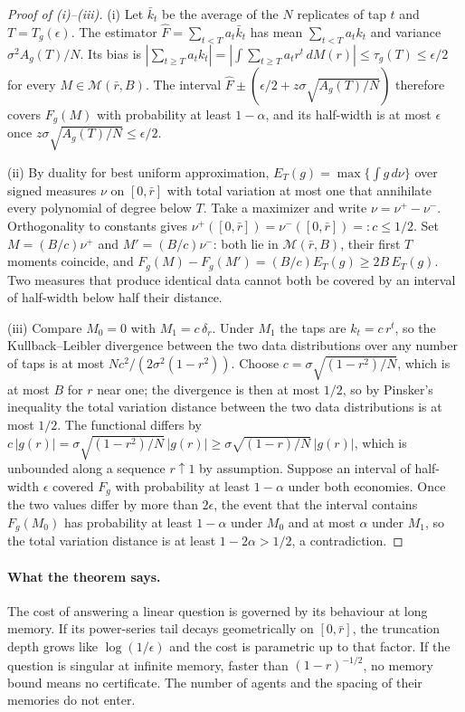 \begin{proof}[Proof of (i)--(iii)]
(i) Let $\bar k_t$ be the average of the $N$ replicates of tap $t$ and $T=T_g(\epsilon)$. The estimator $\hat F=\sum_{t<T}a_t\bar k_t$ has mean $\sum_{t<T}a_tk_t$ and variance $\sigma^2A_g(T)/N$. Its bias is $|\sum_{t\ge T}a_tk_t|=|\int\sum_{t\ge T}a_tr^t\,dM(r)|\le\tau_g(T)\le\epsilon/2$ for every $M\in\mathcal M(\bar r,B)$. The interval $\hat F\pm(\epsilon/2+z\sigma\sqrt{A_g(T)/N})$ therefore covers $F_g(M)$ with probability at least $1-\alpha$, and its half-width is at most $\epsilon$ once $z\sigma\sqrt{A_g(T)/N}\le\epsilon/2$.

(ii) By duality for best uniform approximation, $E_T(g)=\max\{\int g\,d\nu\}$ over signed measures $\nu$ on $[0,\bar r]$ with total variation at most one that annihilate every polynomial of degree below $T$. Take a maximizer and write $\nu=\nu^+-\nu^-$. Orthogonality to constants gives $\nu^+([0,\bar r])=\nu^-([0,\bar r])=:c\le1/2$. Set $M=(B/c)\nu^+$ and $M'=(B/c)\nu^-$: both lie in $\mathcal M(\bar r,B)$, their first $T$ moments coincide, and $F_g(M)-F_g(M')=(B/c)E_T(g)\ge2B\,E_T(g)$. Two measures that produce identical data cannot both be covered by an interval of half-width below half their distance.

(iii) Compare $M_0=0$ with $M_1=c\,\delta_r$. Under $M_1$ the taps are $k_t=c\,r^t$, so the Kullback--Leibler divergence between the two data distributions over any number of taps is at most $Nc^2/(2\sigma^2(1-r^2))$. Choose $c=\sigma\sqrt{(1-r^2)/N}$, which is at most $B$ for $r$ near one; the divergence is then at most $1/2$, so by Pinsker's inequality the total variation distance between the two data distributions is at most $1/2$. The functional differs by $c\,|g(r)|=\sigma\sqrt{(1-r^2)/N}\,|g(r)|\ge\sigma\sqrt{(1-r)/N}\,|g(r)|$, which is unbounded along a sequence $r\uparrow1$ by assumption. Suppose an interval of half-width $\epsilon$ covered $F_g$ with probability at least $1-\alpha$ under both economies. Once the two values differ by more than $2\epsilon$, the event that the interval contains $F_g(M_0)$ has probability at least $1-\alpha$ under $M_0$ and at most $\alpha$ under $M_1$, so the total variation distance is at least $1-2\alpha>1/2$, a contradiction.
\end{proof}

\paragraph{What the theorem says.} The cost of answering a linear question is governed by its behaviour at long memory. If its power-series tail decays geometrically on $[0,\bar r]$, the truncation depth grows like $\log(1/\epsilon)$ and the cost is parametric up to that factor. If the question is singular at infinite memory, faster than $(1-r)^{-1/2}$, no memory bound means no certificate. The number of agents and the spacing of their memories do not enter.

